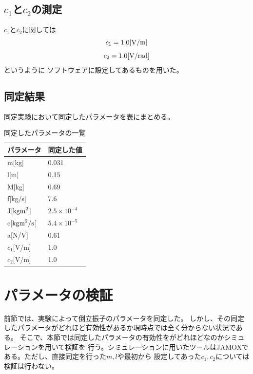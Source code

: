 \subsection{$c_1$と$c_2$の測定}
	$c_1$と$c_2$に関しては
	\[
		c_1 = 1.0 [\rm{V/m}]
	\]
	\[
		c_2 = 1.0[\rm{V/rad}]
	\]
	というように
	ソフトウェアに設定してあるものを用いた。
\subsection{同定結果}
	同定実験において同定したパラメータを表にまとめる。
	\begin{table}[htb]
		\begin{center}
			\caption{同定したパラメータの一覧}
			\medskip
			
			\begin{tabular}{|l|l|}\hline
				パラメータ & 同定した値 \\ \hline\hline
				m[kg]  & 0.031\\ \hline
				l[m] & 0.15\\ \hline
				M[kg] & 0.69\\ \hline
				f[kg/s] & 7.6\\ \hline
				J[$\rm{kgm}^2$] & $2.5\times10^{-4}$\\ \hline
				c[$\rm{kgm}^2/\rm{s}$] & $5.4\times10^{-5}$\\ \hline
				a[N/V] & 0.61\\ \hline
				$c_{1}$[V/m] & 1.0\\ \hline
				$c_{2}$[V/m] & 1.0\\ \hline
			\end{tabular}
		\end{center}
	\end{table}
\section{パラメータの検証}
	前節では、実験によって倒立振子のパラメータを同定した。
	しかし、その同定したパラメータがどれほど有効性があるか現時点では全く分からない状況である。
	そこで、本節では同定したパラメータの有効性をがどれほどなのかシミュレーションを用いて検証を
	行う。シミュレーションに用いたツールはJAMOXである。ただし、直接同定を行った$m,l$や最初から
	設定してあった$c_1,c_2$については検証は行わない。
